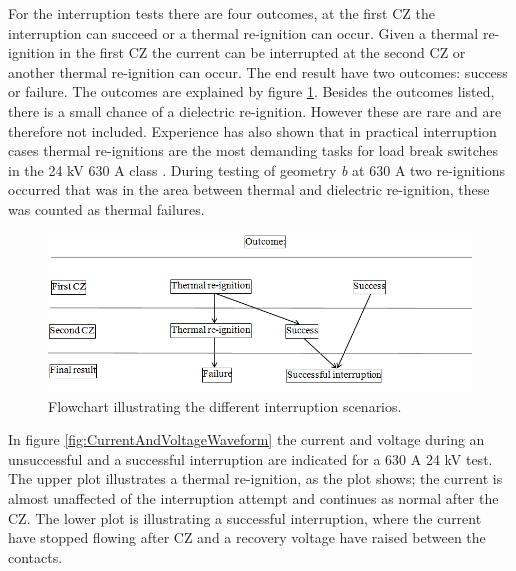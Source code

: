 \documentclass[10pt,a4paper]{article}
\begin{document}
For the interruption tests there are four outcomes, at the first CZ the interruption can succeed or a thermal re-ignition can occur. Given a thermal re-ignition in the first CZ the current can be interrupted at the second CZ or another thermal re-ignition can occur. The end result have two outcomes: success or failure. The outcomes are explained by figure \ref{fig:pilSuccessOfFail}. Besides the outcomes listed, there is a small chance of a dielectric re-ignition. However these are rare and are therefore not included. Experience has also shown that in practical interruption cases thermal re-ignitions are the most demanding tasks for load break switches in the 24 kV 630 A class \cite{bib:AFIMVLBA}. During testing of geometry \textit{b} at 630 A two re-ignitions occurred that was in the area between thermal and dielectric re-ignition, these was counted as thermal failures.

\begin{figure}[H]
\centering
\includegraphics[scale=0.7]{Bilder/Results/interruptionFlowChart.png}
\caption{Flowchart illustrating the different interruption scenarios.} \label{fig:pilSuccessOfFail}
\end{figure}

In figure \ref{fig:CurrentAndVoltageWaveform} the current and voltage during an unsuccessful and a successful interruption are indicated for a 630 A 24 kV test. The upper plot illustrates a thermal re-ignition, as the plot shows; the current is almost unaffected of the interruption attempt and continues as normal after the CZ. The lower plot is illustrating a successful interruption, where the current have stopped flowing after CZ and a recovery voltage have raised between the contacts.
\end{document}
